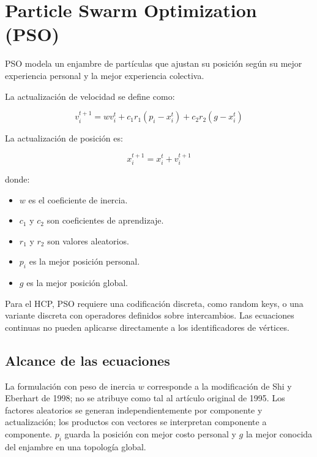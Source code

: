 \section{Particle Swarm Optimization (PSO)}

PSO modela un enjambre de partículas que ajustan su posición según su mejor experiencia personal y la mejor experiencia colectiva.

La actualización de velocidad se define como:

\[
v_i^{t+1}=wv_i^t+c_1r_1(p_i-x_i^t)+c_2r_2(g-x_i^t)
\]

La actualización de posición es:

\[
x_i^{t+1}=x_i^t+v_i^{t+1}
\]

donde:

\begin{itemize}
    \item \(w\) es el coeficiente de inercia.
    \item \(c_1\) y \(c_2\) son coeficientes de aprendizaje.
    \item \(r_1\) y \(r_2\) son valores aleatorios.
    \item \(p_i\) es la mejor posición personal.
    \item \(g\) es la mejor posición global.
\end{itemize}

Para el HCP, PSO requiere una codificación discreta, como random keys, o una variante discreta con operadores definidos sobre intercambios. Las ecuaciones continuas no pueden aplicarse directamente a los identificadores de vértices. \cite{pso1995,pso1998}


\subsection{Alcance de las ecuaciones}
La formulación con peso de inercia $w$ corresponde a la modificación de Shi y Eberhart de 1998; no se atribuye como tal al artículo original de 1995. Los factores aleatorios se generan independientemente por componente y actualización; los productos con vectores se interpretan componente a componente. $p_i$ guarda la posición con mejor costo personal y $g$ la mejor conocida del enjambre en una topología global.\cite{pso1995,pso1998}

